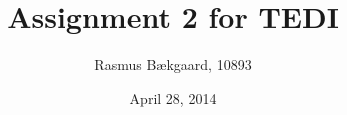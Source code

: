 


\usepackage{graphicx}
\usepackage{amsmath}
\usepackage{amsfonts}
\usepackage{amssymb}





\usepackage[left=3cm,right=2cm,top=2.5cm,bottom=2cm]{geometry}

\linespread{1.5}

\title{Assignment 2 for TEDI}
\author{Rasmus Bækgaard, 10893}
\date{April 28, 2014}